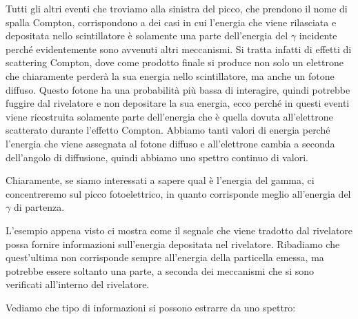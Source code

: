 \begin{esempio}
Tutti gli altri eventi che troviamo alla sinistra del picco, che prendono il nome di spalla Compton, corrispondono a dei casi in cui l'energia che viene rilasciata e depositata nello scintillatore è solamente una parte dell'energia del $\gamma$ incidente perché evidentemente sono avvenuti altri meccanismi\footnotemark. Si tratta infatti di effetti di scattering Compton, dove come prodotto finale si produce non solo un elettrone che chiaramente perderà la sua energia nello scintillatore, ma anche un fotone diffuso. Questo fotone ha una probabilità più bassa di interagire, quindi potrebbe fuggire dal rivelatore e non depositare la sua energia, ecco perché in questi eventi viene ricostruita solamente parte dell'energia che è quella dovuta all'elettrone scatterato durante l'effetto Compton. Abbiamo tanti valori di energia perché l'energia che viene assegnata al fotone diffuso e all'elettrone cambia a seconda dell'angolo di diffusione, quindi abbiamo uno spettro continuo di valori.

Chiaramente, se siamo interessati a sapere qual è l'energia del gamma, ci concentreremo sul picco fotoelettrico, in quanto corrisponde meglio all'energia del $\gamma$ di partenza.
\end{esempio}


L'esempio appena visto ci mostra come il segnale che viene tradotto dal rivelatore possa fornire informazioni sull'energia depositata nel rivelatore. Ribadiamo che quest'ultima non corrisponde sempre all'energia della particella emessa, ma potrebbe essere soltanto una parte, a seconda dei meccanismi che si sono verificati all'interno del rivelatore.

Vediamo che tipo di informazioni si possono estrarre da uno spettro:

